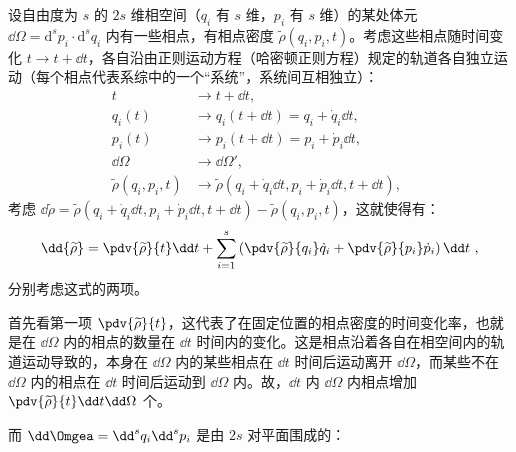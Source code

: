 设自由度为 $s$ 的 $2s$ 维相空间（$q_i$ 有 $s$ 维，$p_i$ 有 $s$ 维）的某处体元 $\dd \Omega = \mathrm{d}^{s}{p_i} \cdot  \mathrm{d}^{s}{q_i}$ 内有一些相点，有相点密度 $\widetilde \rho(q_i, p_i, t)$。考虑这些相点随时间变化 $t \rightarrow t + \dd t$，各自沿由正则运动方程（哈密顿正则方程）规定的轨道各自独立运动（每个相点代表系综中的一个“系统”，系统间互相独立）：
$$
\begin{aligned}
t                            &\rightarrow t+\dd t, \\
q_i(t)                       &\rightarrow q_i(t+\dd t) = q_i + \dot q_i \dd t, \\
p_i(t)                       &\rightarrow p_i(t+\dd t) = p_i + \dot p_i \dd t, \\
\dd \Omega                   &\rightarrow \dd \Omega', \\
\widetilde \rho(q_i, p_i, t) &\rightarrow \widetilde \rho(q_i + \dot q_i \dd t, p_i + \dot p_i \dd t, t + \dd t),
\end{aligned}~~
$$
考虑 $\dd{\widetilde{\rho}} = \widetilde{\rho}(q_i + \dot q_i \dd t, p_i + \dot p_i \dd t, t + \dd t) - \widetilde{\rho}(q_i, p_i, t)$，这就使得有：
\begin{equation}
\dd{\widetilde \rho} = \pdv{\widetilde \rho}{t} \dd t + \sum_{i=1}^{s}\left(\pdv{\widetilde \rho}{q_i}\dot q_i + \pdv{\widetilde \rho}{p_i}\dot p_i\right) \dd t  ~,
\end{equation}
分别考虑这式的两项。

首先看第一项 $\pdv{\widetilde \rho}{t}$，这代表了在固定位置的相点密度的时间变化率，也就是在 $\dd \Omega$ 内的相点的数量在 $\dd t$ 时间内的变化。这是相点沿着各自在相空间内的轨道运动导致的，本身在 $\dd \Omega$ 内的某些相点在 $\dd t$ 时间后运动离开 $\dd \Omega$，而某些不在 $\dd \Omega$ 内的相点在 $\dd t$ 时间后运动到 $\dd \Omega$ 内。故，$\dd t$ 内 $\dd \Omega$ 内相点增加 $\pdv{\widetilde \rho}{t} \dd t \dd \Omega$ 个。

而 $\dd \Omgea = \dd^s q_i \dd^s p_i$ 是由 $2s$ 对平面围成的：
